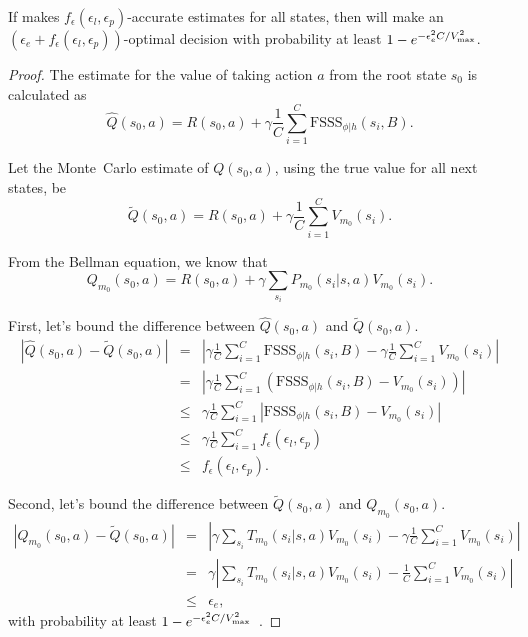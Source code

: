 \begin{lemma}
If  makes $f_\epsilon(\epsilon_l,\epsilon_p)$-accurate estimates for all states, then  will make an $(\epsilon_e+f_\epsilon(\epsilon_l,\epsilon_p))$-optimal decision with probability at least $1-e^{-\epsilon_e^2 C / {V_{\rm max}^2}}$.
\end{lemma}

\begin{proof}

The estimate for the value of taking action $a$ from the root state $s_0$ is calculated as
\begin{equation}
\hat Q(s_0, a) = R(s_0,a) + \gamma \frac 1 C \sum_{i=1}^C \mbox{FSSS}_{\phi|h}(s_i, B).
\end{equation}

Let the Monte~Carlo estimate of $Q(s_0,a)$, using the true value for all next states, be
\begin{equation}
\tilde Q(s_0, a) = R(s_0,a) + \gamma \frac 1 C \sum_{i=1}^C V_{m_0}(s_i).
\end{equation}

From the Bellman equation, we know that
\begin{equation}
Q_{m_0}(s_0, a) = R(s_0,a) + \gamma \sum_{s_i} P_{m_0}(s_i|s,a) V_{m_0}(s_i).
\end{equation}

First, let's bound the difference between $\hat Q(s_0, a)$ and $\tilde Q(s_0, a)$.
\begin{eqnarray}
\nonumber |\hat Q(s_0, a) - \tilde Q(s_0, a)| &=& \left|\gamma \frac 1 C \sum_{i=1}^C \mbox{FSSS}_{\phi|h}(s_i, B) - \gamma \frac 1 C \sum_{i=1}^C V_{m_0}(s_i)\right|\\
\nonumber &=& \left|\gamma \frac 1 C \sum_{i=1}^C \left(\mbox{FSSS}_{\phi|h}(s_i, B) -  V_{m_0}(s_i)\right)\right|\\
\nonumber &\leq& \gamma \frac 1 C \sum_{i=1}^C \left|\mbox{FSSS}_{\phi|h}(s_i, B) -  V_{m_0}(s_i)\right|\\
\nonumber &\leq& \gamma \frac 1 C \sum_{i=1}^C f_\epsilon(\epsilon_l, \epsilon_p)\\
 &\leq& f_\epsilon(\epsilon_l, \epsilon_p).
\end{eqnarray}

Second, let's bound the difference between $\tilde Q(s_0, a)$ and $Q_{m_0}(s_0, a)$.
\begin{eqnarray}
\nonumber |Q_{m_0}(s_0, a) - \tilde Q(s_0, a)| &=& \left|\gamma \sum_{s_i} T_{m_0}(s_i|s,a)V_{m_0}(s_i) - \gamma \frac 1 C \sum_{i=1}^C V_{m_0}(s_i)\right|\\
\nonumber &=& \gamma \left|\sum_{s_i} T_{m_0}(s_i|s,a)V_{m_0}(s_i) - \frac 1 C \sum_{i=1}^C V_{m_0}(s_i)\right|\\
 &\leq& \epsilon_e,
\end{eqnarray}
with probability at least $1-e^{-\epsilon_e^2 C / {V_{\rm max}^2}}$~\cite{kearns99b}.


\end{proof}
